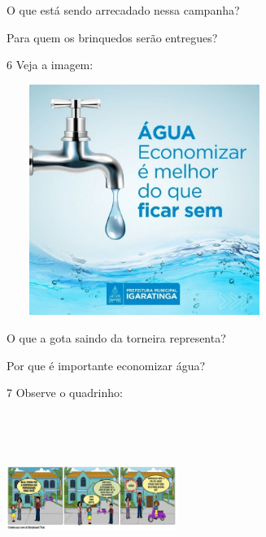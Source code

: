 
\begin{escolha}
\item O que está sendo arrecadado nessa campanha?


\item Para quem os brinquedos serão entregues?

\end{escolha}

\num{6} Veja a imagem:

\includegraphics[width=3.52778in,height=2.95347in]{media/image133.jpeg}


\begin{escolha}
\item O que a gota saindo da torneira representa?


\item Por que é importante economizar água?

\end{escolha}

\num{7} Observe o quadrinho:

\includegraphics[width=2.17917in,height=2.18750in]{media/image129.png}

